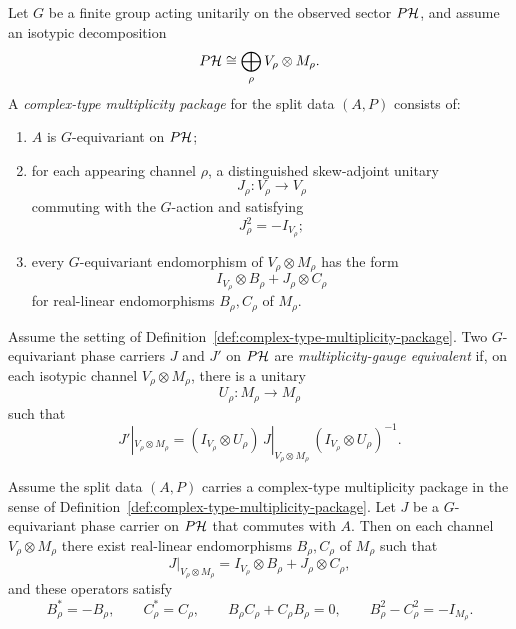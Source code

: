 \begin{definition}
\label{def:complex-type-multiplicity-package}
Let $G$ be a finite group acting unitarily on the observed sector $P\mathcal{H}$, and
assume an isotypic decomposition
\[
P\mathcal{H} \cong \bigoplus_{\rho} V_{\rho}\otimes M_{\rho}.
\]
A \emph{complex-type multiplicity package} for the split data $(A,P)$ consists
of:
\begin{enumerate}[label=(\roman*), leftmargin=2em, itemsep=0.2em]
\item $A$ is $G$-equivariant on $P\mathcal{H}$;
\item for each appearing channel $\rho$, a distinguished skew-adjoint unitary
      \[
      J_{\rho}:V_{\rho}\to V_{\rho}
      \]
      commuting with the $G$-action and satisfying
      \[
      J_{\rho}^2=-I_{V_{\rho}};
      \]
\item every $G$-equivariant endomorphism of $V_{\rho}\otimes M_{\rho}$ has the
      form
      \[
      I_{V_{\rho}}\otimes B_{\rho} + J_{\rho}\otimes C_{\rho}
      \]
      for real-linear endomorphisms $B_{\rho},C_{\rho}$ of $M_{\rho}$.
\end{enumerate}
\end{definition}

\begin{definition}
\label{def:multiplicity-gauge-equivalence}
Assume the setting of Definition~\ref{def:complex-type-multiplicity-package}.
Two $G$-equivariant phase carriers $J$ and $J'$ on $P\mathcal{H}$ are
\emph{multiplicity-gauge equivalent} if, on each isotypic channel
$V_{\rho}\otimes M_{\rho}$, there is a unitary
\[
U_{\rho}:M_{\rho}\to M_{\rho}
\]
such that
\[
J'|_{V_{\rho}\otimes M_{\rho}}
=
(I_{V_{\rho}}\otimes U_{\rho})\,
J|_{V_{\rho}\otimes M_{\rho}}\,
(I_{V_{\rho}}\otimes U_{\rho})^{-1}.
\]
\end{definition}

\begin{theorem}
\label{thm:phase-carrier-normal-form-multiplicity}
Assume the split data $(A,P)$ carries a complex-type multiplicity package in
the sense of Definition~\ref{def:complex-type-multiplicity-package}. Let $J$ be
a $G$-equivariant phase carrier on $P\mathcal{H}$ that commutes with $A$. Then on each
channel $V_{\rho}\otimes M_{\rho}$ there exist real-linear endomorphisms
$B_{\rho},C_{\rho}$ of $M_{\rho}$ such that
\[
J|_{V_{\rho}\otimes M_{\rho}}
=
I_{V_{\rho}}\otimes B_{\rho}
+ J_{\rho}\otimes C_{\rho},
\]
and these operators satisfy
\[
B_{\rho}^*=-B_{\rho},
\qquad
C_{\rho}^*=C_{\rho},
\qquad
B_{\rho}C_{\rho}+C_{\rho}B_{\rho}=0,
\qquad
B_{\rho}^2-C_{\rho}^2=-I_{M_{\rho}}.
\]
\end{theorem}


